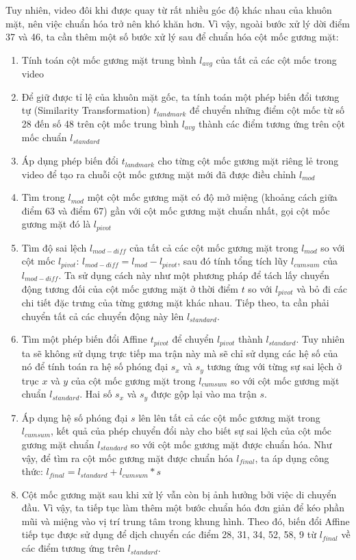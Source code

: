 Tuy nhiên, video đôi khi được quay từ rất nhiều góc độ khác nhau của khuôn mặt, nên việc chuẩn hóa trở nên khó khăn hơn. Vì vậy, ngoài bước xử lý dời điểm 37 và 46, ta cần thêm một số bước xử lý sau để chuẩn hóa cột mốc gương mặt:
\begin{enumerate}
    \item Tính toán cột mốc gương mặt trung bình $l_{avg}$ của tất cả các cột mốc trong video
    \item Để giữ được tỉ lệ của khuôn mặt gốc, ta tính toán một phép biến đổi tương tự (Similarity Transformation) $t_{landmark}$ để chuyển những điểm cột mốc từ số 28 đến số 48 trên cột mốc trung bình $l_{avg}$ thành các điểm tương ứng trên cột mốc chuẩn $l_{standard}$
    \item Áp dụng phép biến đổi $t_{landmark}$ cho từng cột mốc gương mặt riêng lẻ trong video để tạo ra chuỗi cột mốc gương mặt mới đã được điều chỉnh $l_{mod}$
    \item Tìm trong $l_{mod}$ một cột mốc gương mặt có độ mở miệng (khoảng cách giữa điểm 63 và điểm 67) gần với cột mốc gương mặt chuẩn nhất, gọi cột mốc gương mặt đó là $l_{pivot}$
    \item Tìm độ sai lệch $l_{mod-diff}$ của tất cả các cột mốc gương mặt trong $l_{mod}$ so với cột mốc $l_{pivot}$: $l_{mod-diff} = l_{mod} - l_{pivot}$, sau đó tính tổng tích lũy $l_{cumsum}$ của $l_{mod-diff}$. Ta sử dụng cách này như một phương pháp để tách lấy chuyển động tương đối của cột mốc gương mặt ở thời điểm $t$ so với $l_{pivot}$ và bỏ đi các chi tiết đặc trưng của từng gương mặt khác nhau. Tiếp theo, ta cần phải chuyển tất cả các chuyển động này lên $l_{standard}$.
    \item Tìm một phép biến đổi Affine $t_{pivot}$ để chuyển $l_{pivot}$ thành $l_{standard}$. Tuy nhiên ta sẽ không sử dụng trực tiếp ma trận này mà sẽ chỉ sử dụng các hệ số của nó để tính toán ra hệ số phóng đại $s_x$ và $s_y$ tương ứng với từng sự sai lệch ở trục $x$ và $y$ của cột mốc gương mặt trong $l_{cumsum}$ so với cột mốc gương mặt chuẩn $l_{standard}$. Hai số $s_x$ và $s_y$ được gộp lại vào ma trận $s$.
    \item Áp dụng hệ số phóng đại $s$ lên lên tất cả các cột mốc gương mặt trong $l_{cumsum}$, kết quả của phép chuyển đổi này cho biết sự sai lệch của cột mốc gương mặt chuẩn $l_{standard}$ so với cột mốc gương mặt được chuẩn hóa. Như vậy, để tìm ra cột mốc gương mặt được chuẩn hóa $l_{final}$, ta áp dụng công thức: $l_{final} = l_{standard} + l_{cumsum}*s$
    \item Cột mốc gương mặt sau khi xử lý vẫn còn bị ảnh hưởng bởi việc di chuyển đầu. Vì vậy, ta tiếp tục làm thêm một bước chuẩn hóa đơn giản để kéo phần mũi và miệng vào vị trí trung tâm trong khung hình. Theo đó, biến đổi Affine tiếp tục được sử dụng để dịch chuyển các điểm 28, 31, 34, 52, 58, 9 từ $l_{final}$ về các điểm tương ứng trên $l_{standard}$.
\end{enumerate}

